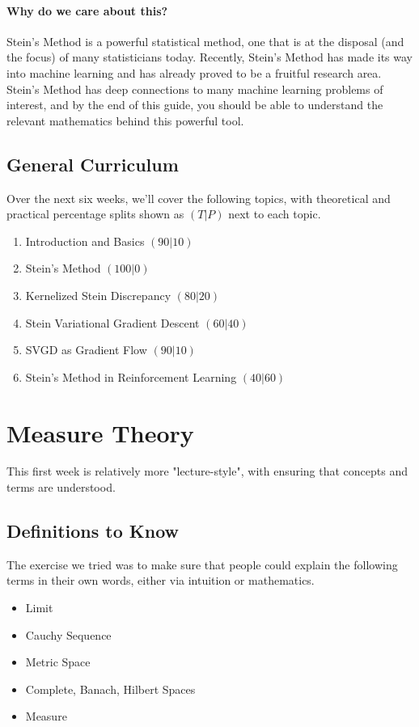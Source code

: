 \documentclass[12pt]{article}
\begin{document}
\paragraph{Why do we care about this?} Stein's Method is a powerful statistical method, one that is at the disposal (and the focus) of many statisticians today. Recently, Stein's Method has made its way into machine learning and has already proved to be a fruitful research area. Stein's Method has deep connections to many machine learning problems of interest, and by the end of this guide, you should be able to understand the relevant mathematics behind this powerful tool.   
\subsection{General Curriculum}

Over the next six weeks, we'll cover the following topics, with theoretical and practical percentage splits shown as $(T | P)$ next to each topic.

\begin{enumerate}
    \item Introduction and Basics $(90 | 10)$
    \item Stein's Method $(100 | 0)$
    \item Kernelized Stein Discrepancy $(80 | 20)$
    \item Stein Variational Gradient Descent $(60 | 40)$
    \item SVGD as Gradient Flow $(90 | 10)$
    \item Stein's Method in Reinforcement Learning $(40 | 60)$
\end{enumerate}

\section{Measure Theory}

This first week is relatively more "lecture-style", with ensuring that concepts and terms are understood. 

\subsection{Definitions to Know}

The exercise we tried was to make sure that people could explain the following terms in their own words, either via intuition or mathematics.

\begin{itemize}
    \item Limit
    \item Cauchy Sequence
    \item Metric Space
    \item Complete, Banach, Hilbert Spaces
    \item Measure
\end{itemize}
\end{document}
